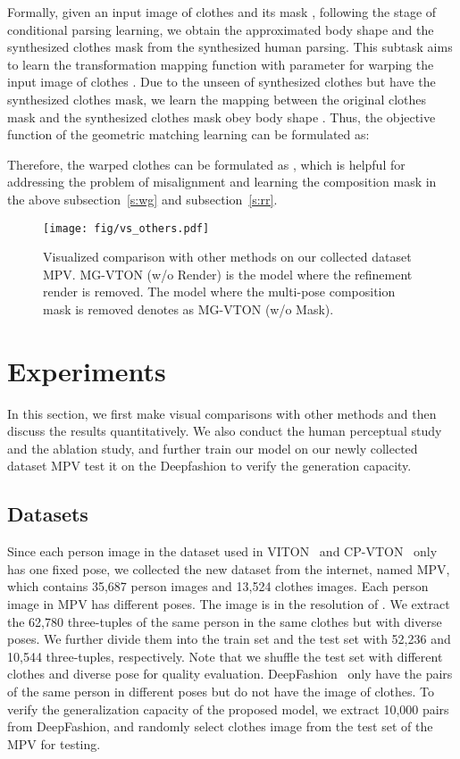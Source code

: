 \documentclass[10pt,twocolumn,letterpaper]{article}
\begin{document}
Formally, given an input image of clothes  and its mask , following the stage of conditional parsing learning, we obtain the approximated body shape  and the synthesized clothes mask  from the synthesized human parsing. This subtask aims to learn the transformation mapping function  with parameter  for warping the input image of clothes . Due to the unseen of synthesized clothes but have the synthesized clothes mask, we learn the mapping between the original clothes mask  and the synthesized clothes mask  obey body shape . Thus, the objective function of the geometric matching learning can be formulated as:

Therefore, the warped clothes  can be formulated as , which is helpful for addressing the problem of misalignment and learning the composition mask in the above subsection~\ref{s:wg} and subsection~\ref{s:rr}.


\begin{figure*}[!tp]
\centering
\texttt{[image: fig/vs\_others.pdf]} 
\caption{Visualized comparison with other methods on our collected dataset MPV. MG-VTON (w/o Render) is the model where the refinement render is removed. The model where the multi-pose composition mask is removed denotes as MG-VTON (w/o Mask).}
\label{fig:vs_others}
\vspace{-4mm}
\end{figure*}


\section{Experiments}
In this section, we first make visual comparisons with other methods and then discuss the results quantitatively. We also conduct the human perceptual study and the ablation study, and further train our model on our newly collected dataset MPV test it on the Deepfashion to verify the generation capacity.

\subsection{Datasets}
Since each person image in the dataset used in VITON~\cite{han2017viton} and CP-VTON~\cite{wang2018cpvton} only has one fixed pose, we collected the new dataset from the internet, named MPV, which contains 35,687 person images and 13,524 clothes images. Each person image in MPV has different poses. The image is in the resolution of . We extract the 62,780 three-tuples of the same person in the same clothes but with diverse poses. We further divide them into the train set and the test set with 52,236 and 10,544 three-tuples, respectively. Note that we shuffle the test set with different clothes and diverse pose for quality evaluation. DeepFashion~\cite{liu2016deepfashion} only have the pairs of the same person in different poses but do not have the image of clothes. To verify the generalization capacity of the proposed model, we extract 10,000 pairs from DeepFashion, and randomly select clothes image from the test set of the MPV for testing.
\end{document}

